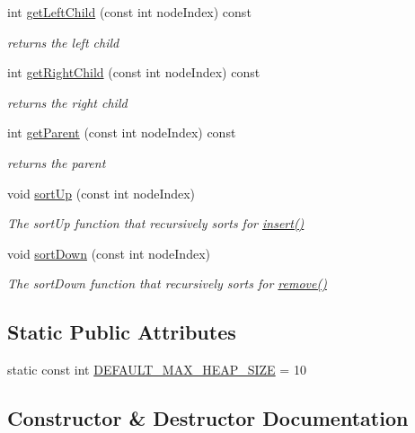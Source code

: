 \begin{DoxyCompactItemize}
int \hyperlink{class_heap_a35ffb267d73fdd5c106f82459b69cf2f}{get\+Left\+Child} (const int node\+Index) const 
\begin{DoxyCompactList}\small\item\em returns the left child \end{DoxyCompactList}\item 
int \hyperlink{class_heap_ae367797460e0f8923b72c1379ec9a9c2}{get\+Right\+Child} (const int node\+Index) const 
\begin{DoxyCompactList}\small\item\em returns the right child \end{DoxyCompactList}\item 
int \hyperlink{class_heap_a524cd0cd256e21b565f04b26297c0fd8}{get\+Parent} (const int node\+Index) const 
\begin{DoxyCompactList}\small\item\em returns the parent \end{DoxyCompactList}\item 
void \hyperlink{class_heap_a08cf707b0057b977fc1896bf38800027}{sort\+Up} (const int node\+Index)
\begin{DoxyCompactList}\small\item\em The sort\+Up function that recursively sorts for \hyperlink{class_heap_aa68cf80454ab1b246fa723612805a91e}{insert()} \end{DoxyCompactList}\item 
void \hyperlink{class_heap_a31eaa08f4ad1159b6272e0e32486702c}{sort\+Down} (const int node\+Index)
\begin{DoxyCompactList}\small\item\em The sort\+Down function that recursively sorts for \hyperlink{class_heap_a4a18bfdacd897c45fc3da13f22b8930d}{remove()} \end{DoxyCompactList}\end{DoxyCompactItemize}
\subsection*{Static Public Attributes}
\begin{DoxyCompactItemize}
\item 
static const int \hyperlink{class_heap_a967c19732a20a72e8e824402ad6763c8}{D\+E\+F\+A\+U\+L\+T\+\_\+\+M\+A\+X\+\_\+\+H\+E\+A\+P\+\_\+\+S\+I\+ZE} = 10
\end{DoxyCompactItemize}


\subsection{Constructor \& Destructor Documentation}
